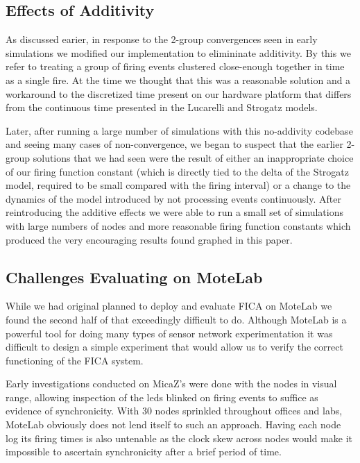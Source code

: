 \subsection{Effects of Additivity}

As discussed earier, in response to the 2-group convergences seen in early
simulations we modified our implementation to elimininate additivity.  By
this we refer to treating a group of firing events clustered close-enough
together in time as a single fire.  At the time we thought that this was a
reasonable solution and a workaround to the discretized time present on our
hardware platform that differs from the continuous time presented in the
Lucarelli and Strogatz models.

Later, after running a large number of simulations with this no-addivity
codebase and seeing many cases of non-convergence, we began to suspect that
the earlier 2-group solutions that we had seen were the result of either an
inappropriate choice of our firing function constant (which is directly tied
to the delta of the Strogatz model, required to be small compared with the
firing interval) or a change to the dynamics of the model introduced by not
processing events continuously.  After reintroducing the additive effects we
were able to run a small set of simulations with large numbers of nodes and
more reasonable firing function constants which produced the very encouraging
results found graphed in this paper.

\subsection{Challenges Evaluating on MoteLab}

While we had original planned to deploy and evaluate FICA on MoteLab we found
the second half of that exceedingly difficult to do.  Although MoteLab is a
powerful tool for doing many types of sensor network experimentation it was
difficult to design a simple experiment that would allow us to verify the
correct functioning of the FICA system.

Early investigations conducted on MicaZ's were done with the nodes in visual
range, allowing inspection of the leds blinked on firing events to suffice as
evidence of synchronicity.  With 30 nodes sprinkled throughout offices and
labs, MoteLab obviously does not lend itself to such an approach.  Having
each node log its firing times is also untenable as the clock skew across
nodes would make it impossible to ascertain synchronicity after a brief
period of time.


